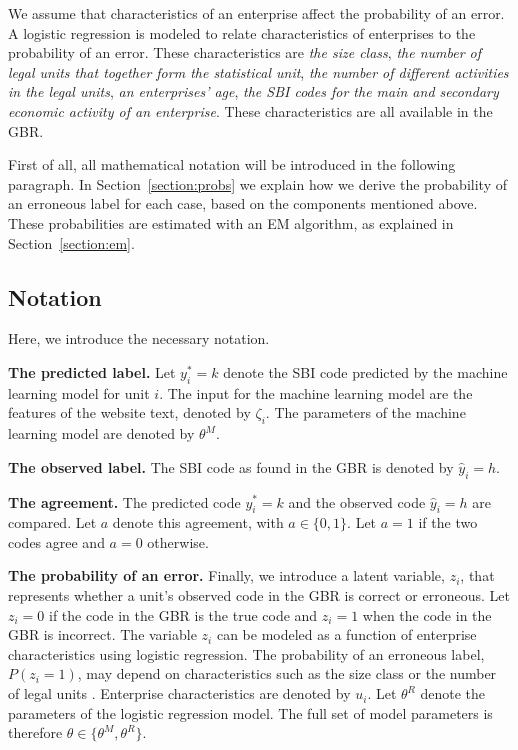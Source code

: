 \documentclass[12pt, a4paper, titlepage]{article}
\begin{document}
We assume that characteristics of an enterprise affect the probability of an error. A logistic regression is modeled to relate characteristics of enterprises to the probability of an error. These characteristics are \textit{the size class}, \textit{the number of legal units that together form the statistical unit}, \textit{the number of different activities in the legal units}, \textit{an enterprises' age}, \textit{the SBI codes for the main and secondary economic activity of an enterprise}. These characteristics are all available in the GBR.
\bigskip

First of all, all mathematical notation will be introduced in the following paragraph. In Section~\ref{section:probs} we explain how we derive the probability of an erroneous label for each case, based on the components mentioned above. These probabilities are estimated with an EM algorithm, as explained in Section~\ref{section:em}.

							\subsection{Notation}
Here, we introduce the necessary notation.

\textbf{The predicted label.} Let $y^*_i = k$ denote the SBI code predicted by the machine learning model for unit $i$. The input for the machine learning model are the features of the website text, denoted by $\zeta_i$. The parameters of the machine learning model are denoted by $\theta^M$. 

\textbf{The observed label.} The SBI code as found in the GBR is denoted by $\hat{y}_i = h$. 

\textbf{The agreement.} The predicted code $y^*_i = k$ and the observed code  $\hat{y}_i = h$ are compared. Let $a$ denote this agreement, with $a \in \{0,1\}$. Let $a=1$ if the two codes agree and $a=0$ otherwise.

\textbf{The probability of an error.} Finally, we introduce a latent variable, $z_i$, that represents whether a unit's observed code in the GBR is correct or erroneous. Let $z_i = 0$ if the code in the GBR is the true code and $z_i = 1$ when the code in the GBR is incorrect. The variable $z_i$ can be modeled as a function of enterprise characteristics using logistic regression. The probability of an erroneous label, $P(z_i = 1)$, may depend on characteristics such as the size class or the number of legal units \citep{DeldenScholtusBurger}. Enterprise characteristics are denoted by  $u_i$. Let $\theta^R$ denote the parameters of the logistic regression model. The full set of model parameters is therefore $\theta \in \{ \theta^M, \theta^R\}$. 
\end{document}
